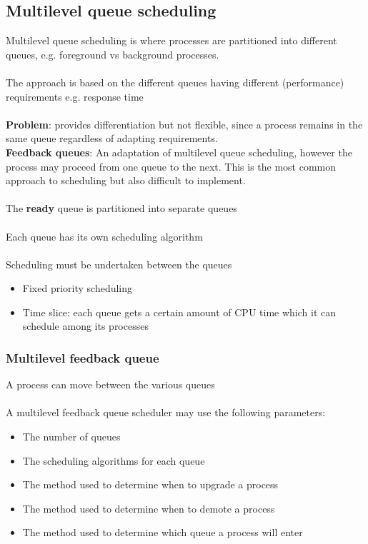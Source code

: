 \documentclass{article}[18pt]
\begin{document}
\subsection{Multilevel queue scheduling}
Multilevel queue scheduling is where processes are partitioned into different queues, e.g. foreground vs background processes.\\
\\
The approach is based on the different queues having different (performance) requirements e.g. response time\\
\\
\textbf{Problem}: provides differentiation but not flexible, since a process remains in the same queue regardless of adapting requirements.\\
\textbf{Feedback queues}: An adaptation of multilevel queue scheduling, however the process may proceed from one queue to the next. This is the most common approach to scheduling but also difficult to implement.\\
\\
The \textbf{ready} queue is partitioned into separate queues\\
\\
Each queue has its own scheduling algorithm\\
\\
Scheduling must be undertaken between the queues
\begin{itemize}
\item Fixed priority scheduling
\item Time slice: each queue gets a certain amount of CPU time which it can schedule among its processes
\end{itemize}
\subsubsection{Multilevel feedback queue}
A process can move between the various queues\\
\\
A multilevel feedback queue scheduler may use the following parameters:
\begin{itemize}
\item The number of queues
\item The scheduling algorithms for each queue
\item The method used to determine when to upgrade a process
\item The method used to determine when to demote a process
\item The method used to determine which queue a process will enter
\end{itemize}
\end{document}
